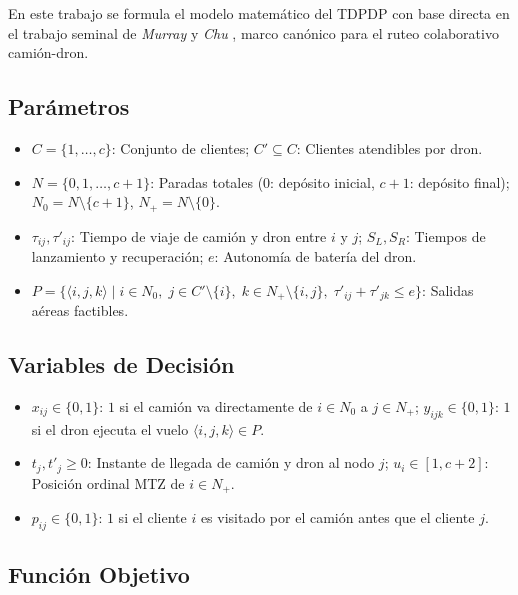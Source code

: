 \setlength{\abovedisplayskip}{2pt}
\setlength{\belowdisplayskip}{2pt}
\setlength{\abovedisplayshortskip}{1pt}
\setlength{\belowdisplayshortskip}{1pt}

En este trabajo se formula el modelo matemático del TDPDP con base directa en el trabajo seminal de \textit{Murray} y \textit{Chu} \cite{Murray2015Flying}, marco canónico para el ruteo colaborativo camión-dron.

\subsection{Parámetros}

\begin{itemize}[noitemsep, topsep=1pt, parsep=0pt, leftmargin=*]
\item $C = \{1,\dots,c\}$: Conjunto de clientes; $C' \subseteq C$: Clientes atendibles por dron.
\item $N = \{0, 1, \dots, c+1\}$: Paradas totales ($0$: depósito inicial, $c+1$: depósito final); $N_0 = N \setminus \{c+1\}$, $N_+ = N \setminus \{0\}$.
\item $\tau_{ij}, \tau'_{ij}$: Tiempo de viaje de camión y dron entre $i$ y $j$; $S_L, S_R$: Tiempos de lanzamiento y recuperación; $e$: Autonomía de batería del dron.
\item $P = \{\langle i,j,k \rangle \mid i \in N_0, \; j \in C' \setminus \{i\}, \; k \in N_+ \setminus \{i,j\}, \; \tau'_{ij} + \tau'_{jk} \le e\}$: Salidas aéreas factibles.
\end{itemize}

\subsection{Variables de Decisión}

\begin{itemize}[noitemsep, topsep=1pt, parsep=0pt, leftmargin=*]
\item $x_{ij} \in \{0,1\}$: $1$ si el camión va directamente de $i \in N_0$ a $j \in N_+$; $y_{ijk} \in \{0,1\}$: $1$ si el dron ejecuta el vuelo $\langle i,j,k \rangle \in P$.
\item $t_j, t'_j \ge 0$: Instante de llegada de camión y dron al nodo $j$; $u_i \in [1, c+2]$: Posición ordinal MTZ de $i \in N_+$.
\item $p_{ij} \in \{0,1\}$: $1$ si el cliente $i$ es visitado por el camión antes que el cliente $j$.
\end{itemize}

\subsection{Función Objetivo}

